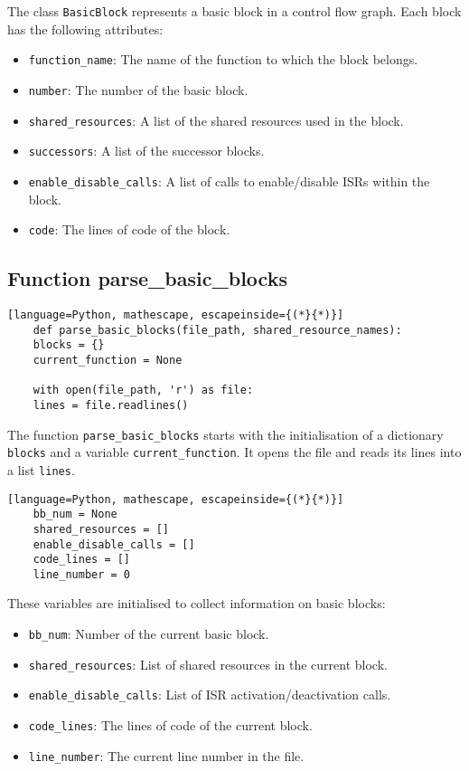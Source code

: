 \documentclass[
fancyheadings, %
%
%
]{stsreprt}
\begin{document}
{The class \texttt{BasicBlock} represents a basic block in a control flow graph. Each block has the following attributes:
\begin{itemize}
	\item \texttt{function\_name}: The name of the function to which the block belongs.
	\item \texttt{number}: The number of the basic block.
	\item \texttt{shared\_resources}: A list of the shared resources used in the block.
	\item \texttt{successors}: A list of the successor blocks.
	\item \texttt{enable\_disable\_calls}: A list of calls to enable/disable ISRs within the block.
	\item \texttt{code}: The lines of code of the block.
\end{itemize}


\subsection*{Function parse\_basic\_blocks}

\begin{lstlisting}[language=Python, mathescape, escapeinside={(*}{*)}]
	def parse_basic_blocks(file_path, shared_resource_names):
	blocks = {}
	current_function = None
	
	with open(file_path, 'r') as file:
	lines = file.readlines()
\end{lstlisting}

The function \texttt{parse\_basic\_blocks} starts with the initialisation of a dictionary \texttt{blocks} and a variable \texttt{current\_function}. It opens the file and reads its lines into a list \texttt{lines}.

\begin{lstlisting}[language=Python, mathescape, escapeinside={(*}{*)}]
	bb_num = None
	shared_resources = []
	enable_disable_calls = []
	code_lines = []
	line_number = 0  
\end{lstlisting}

These variables are initialised to collect information on basic blocks: 
\begin{itemize}
	\item \texttt{bb\_num}: Number of the current basic block.
	\item \texttt{shared\_resources}: List of shared resources in the current block.
	\item \texttt{enable\_disable\_calls}: List of ISR activation/deactivation calls.
	\item \texttt{code\_lines}: The lines of code of the current block.
	\item \texttt{line\_number}: The current line number in the file.
\end{itemize}

}
\end{document}
